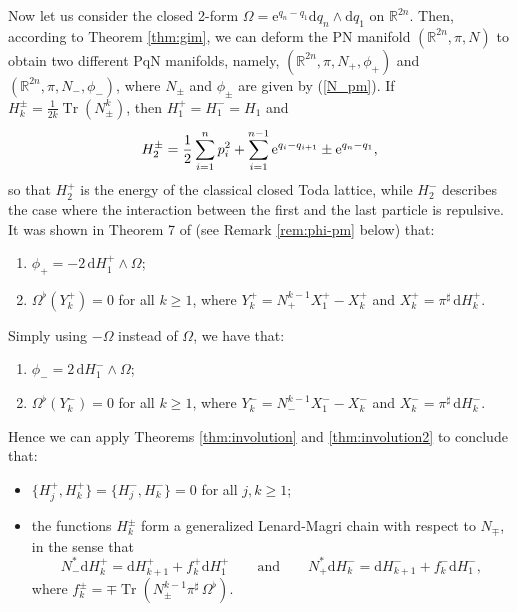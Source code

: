 \documentclass[12pt]{article}
\def\d{{\mathrm d}}
\def\parpo#1#2{\{#1,#2\}}
\newcommand{\RR}{{{\mathbb{R}}}}
\def\M{{\mathcal M}}
\def\Tr{\operatorname{Tr}}
\begin{document}
Now let us consider the closed 2-form $\Omega=\mathrm{e}^{q_n-q_1}\d q_n\wedge \d q_1$ on $\RR^{2n}$. Then, according to Theorem 
\ref{thm:gim}, we can deform the PN manifold $(\RR^{2n},\pi,N)$ to obtain two different PqN manifolds, namely, 
$(\RR^{2n},\pi,N_+,\phi_+)$ and $(\RR^{2n},\pi,N_-,\phi_-)$, where $N_\pm$ and $\phi_\pm$ are given by (\ref{N_pm}).
If $H^\pm_k=\frac1{2k}\Tr(N_\pm^k)$, then $H^+_1=H^-_1=H_1$ and 
\begin{equation}
\label{energy-closed-Toda}
H^\pm_2=\frac12\sum_{i=1}^{n}p_i^2+\sum_{i=1}^{n-1}{\rm e}^{q_i-q_{i+1}}\pm {\rm e}^{q_n-q_1},
\end{equation}
so that $H^+_2$ is the energy of the classical closed Toda lattice, while $H^-_2$ describes the case where the interaction between 
the first and the last particle is repulsive. %
It was shown in Theorem 7 of \cite{FMOP2020} (see Remark \ref{rem:phi-pm} below) that:
\begin{enumerate}
\item $\phi_+=-2\,\d H_1^+\wedge\Omega$; 
\item $\Omega^\flat({Y_k^+})=0$ for all $k\ge 1$, where $Y_k^+=N_+^{k-1}X_1^+ -X^+_k$ and $X^+_k=\pi^\sharp\,\d H^+_k$.
\end{enumerate}
Simply using $-\Omega$ instead of $\Omega$, we have that:
\begin{enumerate}
\item[3.] $\phi_-=2\,\d H_1^-\wedge\Omega$; 
\item[4.] $\Omega^\flat({Y_k^-})=0$ for all $k\ge 1$, where $Y_k^-=N_-^{k-1}X^-_1-X^-_k$ and $X^-_k=\pi^\sharp\,\d H^-_k$.
\end{enumerate}
Hence we can apply Theorems \ref{thm:involution} and \ref{thm:involution2} to conclude that:
\begin{itemize}
\item[i)] %
$\parpo{H^+_j}{H^+_k}=\parpo{H^-_j}{H^-_k}=0$ for all $j,k\ge 1$;
\item[ii)] the functions $H_k^\pm$ form a generalized Lenard-Magri chain %
with respect to $N_\mp$, in the sense that
\begin{equation}
\label{gen-LM-chain-pm}
N_-^* \d H_k^+ = \d H_{k+1}^+ + f^+_k \d H_1^+ \qquad\mbox{and}\qquad
N_+^* \d H_k^- = \d H_{k+1}^- + f^-_k \d H_1^-,
\end{equation}
where $f^\pm_k=\mp\Tr\left({N}_\pm^{k-1}\pi^\sharp\,\Omega^\flat\right)$.
\end{itemize}
\end{document}

